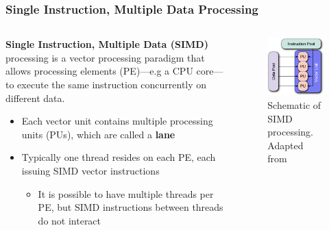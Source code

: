 \documentclass{beamer}
\begin{document}
\begin{frame}
 \frametitle{Single Instruction, Multiple Data Processing}
 \begin{columns}
 
 \begin{column}{0.6\textwidth}
  \textbf{Single Instruction, Multiple Data (SIMD)} processing is a vector processing paradigm that allows processing elements (PE)---e.g a CPU core---to execute the same instruction concurrently on different data.
  \begin{itemize}
    \item Each vector unit contains multiple processing units (PUs), which are called a \textbf{lane}
    \item Typically one thread resides on each PE, each issuing SIMD vector instructions
    \begin{itemize}
     \item It is possible to have multiple threads per PE, but SIMD instructions between threads do not interact
    \end{itemize}
  \end{itemize}
 \end{column}
 \begin{column}{0.4\textwidth}
  \begin{figure}
    \centering
    \includegraphics[width=\columnwidth]{SIMD.pdf}
    \caption{Schematic of SIMD processing.  Adapted from\footnotemark}
  \end{figure}
 \end{column}
 \end{columns}
\end{frame}
\end{document}
